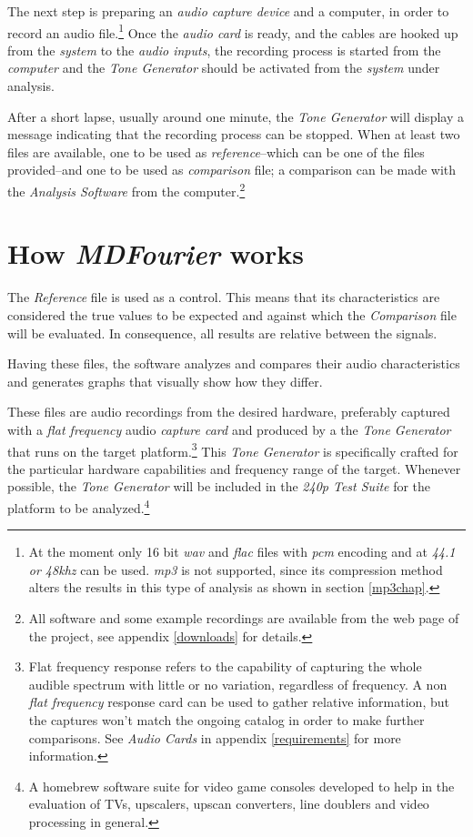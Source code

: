 \documentclass[10pt,a4paper]{report}
\newcommand{\ac}[1]{\textit{\acrshort{#1}}}
\newcommand{\khz}[1]{\textit{#1\acrshort{khz}}}
\begin{document}
The next step is preparing an \textit{audio capture device} and a computer, in order to record an audio file.\footnote{At the moment only 16 bit \ac{wav} and \ac{flac} files with \ac{pcm} encoding and at \khz{44.1 or 48} can be used. \ac{mp3} is not supported, since its compression method alters the results in this type of analysis as shown in section \ref{mp3chap}.} Once the \textit{audio card} is ready, and the cables are hooked up from the \textit{system} to the \textit{audio inputs}, the recording process is started from the \textit{computer} and the \textit{Tone Generator} should be activated from the \textit{system} under analysis.

After a short lapse, usually around one minute, the \textit{Tone Generator} will display a message indicating that the recording process can be stopped. When at least two files are available, one to be used as \textit{reference}--which can be one of the files provided--and one to be used as \textit{comparison} file; a comparison can be made with the \textit{Analysis Software} from the computer.\footnote{All software and some example recordings are available from the web page of the project, see appendix \ref{downloads} for details.}

\section{How \textit{MDFourier} works}

The \textit{Reference} file is used as a control. This means that its characteristics are considered the true values to be expected and against which the \textit{Comparison} file will be evaluated. In consequence, all results are relative between the signals.

Having these files, the software analyzes and compares their audio characteristics and generates graphs that visually show how they differ.

These files are audio recordings from the desired hardware, preferably captured with a \textit{flat frequency} audio \textit{capture card} and produced by a the \textit{Tone Generator} that runs on the target platform.\footnote{Flat frequency response refers to the capability of capturing the whole audible spectrum with little or no variation, regardless of frequency. A non \textit{flat frequency} response card can be used to gather relative information, but the captures won't match the ongoing catalog in order to make further comparisons. See \textit{Audio Cards} in appendix \ref{requirements} for more information.} This \textit{Tone Generator} is specifically crafted for the particular hardware capabilities and frequency range of the target. Whenever possible, the \textit{Tone Generator} will be included in the \textit{240p Test Suite} for the platform to be analyzed.\footnote{A homebrew software suite for video game consoles developed to help in the evaluation of TVs, upscalers, upscan converters, line doublers and video processing in general.\cite{240pSuite}}
\end{document}
